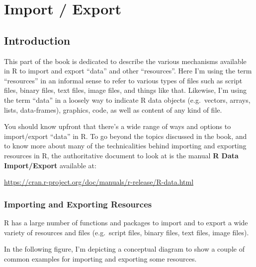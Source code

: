 \documentclass[
]{book}
\begin{document}
\hypertarget{part-import-export}{%
\part{Import / Export}\label{part-import-export}}

\hypertarget{input-output}{%
\chapter{Introduction}\label{input-output}}

This part of the book is dedicated to describe the various mechanisms available
in R to import and export ``data'' and other ``resources''. Here I'm using the term
``resources'' in an informal sense to refer to various types of files such as
script files, binary files, text files, image files, and things like that.
Likewise, I'm using the term ``data'' in a loosely way to indicate R data objects
(e.g.~vectors, arrays, lists, data-frames), graphics, code, as well as content
of any kind of file.

You should know upfront that there's a wide range of ways and options to
import/export ``data'' in R. To go beyond the topics discussed in the book,
and to know more about many of the technicalities behind importing and
exporting resources in R, the authoritative document to look at is the
manual \textbf{R Data Import/Export} available at:

\url{https://cran.r-project.org/doc/manuals/r-release/R-data.html}

\hypertarget{importing-and-exporting-resources}{%
\section{Importing and Exporting Resources}\label{importing-and-exporting-resources}}

R has a large number of functions and packages to import and to export a wide
variety of resources and files (e.g.~script files, binary files, text files,
image files).

In the following figure, I'm depicting a conceptual diagram to show a couple
of common examples for importing and exporting some resources.
\end{document}
